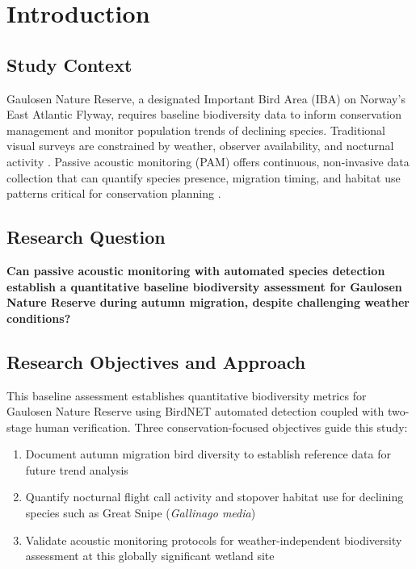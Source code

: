 \documentclass[english,twocolumn]{article}
\begin{document}

\section{Introduction}

\subsection{Study Context}

Gaulosen Nature Reserve, a designated Important Bird Area (IBA) on Norway's East Atlantic Flyway, requires baseline biodiversity data to inform conservation management and monitor population trends of declining species. Traditional visual surveys are constrained by weather, observer availability, and nocturnal activity \citep{Shonfield2017}. Passive acoustic monitoring (PAM) offers continuous, non-invasive data collection that can quantify species presence, migration timing, and habitat use patterns critical for conservation planning \citep{Sugai2019}.

\subsection{Research Question}

\textbf{Can passive acoustic monitoring with automated species detection establish a quantitative baseline biodiversity assessment for Gaulosen Nature Reserve during autumn migration, despite challenging weather conditions?}

\subsection{Research Objectives and Approach}

This baseline assessment establishes quantitative biodiversity metrics for Gaulosen Nature Reserve using BirdNET automated detection coupled with two-stage human verification. Three conservation-focused objectives guide this study:

\begin{enumerate}
\item Document autumn migration bird diversity to establish reference data for future trend analysis
\item Quantify nocturnal flight call activity and stopover habitat use for declining species such as Great Snipe (\textit{Gallinago media})
\item Validate acoustic monitoring protocols for weather-independent biodiversity assessment at this globally significant wetland site
\end{enumerate}
\end{document}
